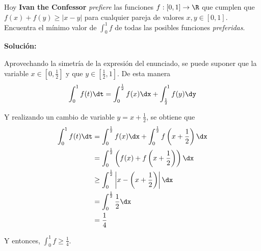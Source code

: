\documentclass[../../main.tex]{subfiles}
\begin{document}
  \begin{shaded}
    Hoy \textbf{Ivan the Confessor} \textit{prefiere} las funciones $f: [0, 1] \to \R$ que cumplen que $f(x) + f(y) \geq |x - y|$ para cualquier pareja de valores $x, y \in [0, 1]$. Encuentra el mínimo valor de $\displaystyle\int_0^1 f$ de todas las posibles funciones \textit{preferidas}.
  \end{shaded}

  \textbf{Solución:}

  Aprovechando la simetría de la expresión del enunciado, se puede suponer que la variable $x \in \left[0, \displaystyle\frac{1}{2}\right]$ y que $y \in \left[\displaystyle\frac{1}{2}, 1\right]$. De esta manera
  $$
  \int_0^1 f(t) \dt = \int_0^\frac{1}{2} f(x) \dx + \int_\frac{1}{2}^1 f(y) \dy
  $$

  Y realizando un cambio de variable $y = x + \displaystyle\frac{1}{2}$, se obtiene que
  \begin{equation*}
    \begin{split}
      \int_0^1 f(t) \dt & = \int_0^\frac{1}{2} f(x) \dx + \int_0^\frac{1}{2} f\left(x + \frac{1}{2}\right) \dx \\ & =
      \int_0^\frac{1}{2} \left(f(x) + f\left(x + \frac{1}{2}\right)\right) \dx \\ & \geq
      \int_0^\frac{1}{2} \left|x - \left(x + \frac{1}{2}\right)\right| \dx \\ & =
      \int_0^\frac{1}{2} \frac{1}{2} \dx \\ & =
      \frac{1}{4}
    \end{split}
  \end{equation*}

  Y entonces, $\displaystyle\int_0^1 f \geq \displaystyle\frac{1}{4}$.
\end{document}
